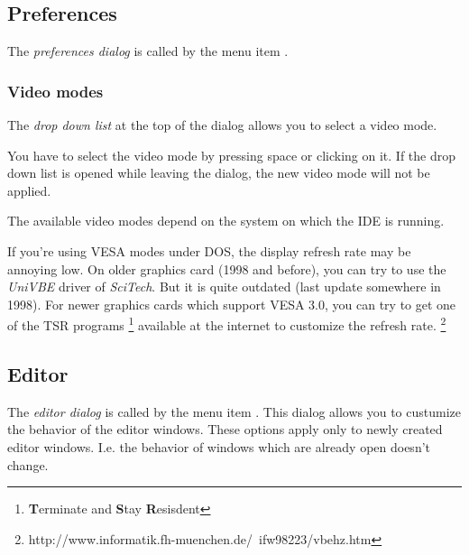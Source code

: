 \subsection{Preferences}
The \emph{preferences dialog} is called by the menu item
.


\subsubsection{Video modes}
The \emph{drop down list} at the top of the dialog allows you
to select a video mode.

\begin{remark}
You have to select the video mode by pressing space or clicking
on it. If the drop down list is opened while leaving the dialog,
the new video mode will not be applied.
\end{remark}

The available video modes depend on the system on which the IDE
is running.

\begin{remark}
If you're using VESA modes under DOS, the display refresh rate may be
annoying low. On older graphics card (1998 and before),
you can try to use the \emph{UniVBE} driver of \emph{SciTech}. But
it is quite outdated (last update somewhere in 1998). For newer
graphics cards which support VESA 3.0, you can try to get one
of the TSR programs
\footnote{\textbf{T}erminate and \textbf{S}tay \textbf{R}esisdent}
available at the internet to customize the refresh rate.
\footnote{http://www.informatik.fh-muenchen.de/~ifw98223/vbehz.htm}
\end{remark}

\subsection{Editor}
\label{ide:prefeditor}
The \emph{editor dialog} is called by the menu item
. This dialog allows you to custumize
the behavior of the editor windows. These options apply only to
newly created editor windows. I.e. the behavior of
windows which are already open doesn't change.

